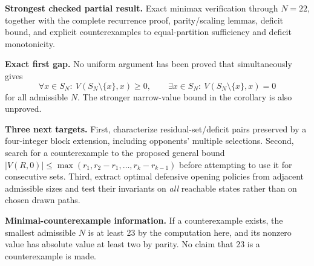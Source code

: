 \documentclass[11pt,a4paper]{article}
\theoremstyle{definition}\newtheorem{definition}[theorem]{Definition}
\theoremstyle{remark}\newtheorem{remark}[theorem]{Remark}
\newcommand{\1}{\mathbf 1}
\begin{document}
\textbf{Strongest checked partial result.} Exact minimax verification through $N=22$, together with the complete recurrence proof, parity/scaling lemmas, deficit bound, and explicit counterexamples to equal-partition sufficiency and deficit monotonicity.

\textbf{Exact first gap.} No uniform argument has been proved that simultaneously gives
\[
 \forall x\in S_N:\ V(S_N\setminus\{x\},x)\ge0,
 \qquad \exists x\in S_N:\ V(S_N\setminus\{x\},x)=0
\]
for all admissible $N$. The stronger narrow-value bound in the corollary is also unproved.

\textbf{Three next targets.} First, characterize residual-set/deficit pairs preserved by a four-integer block extension, including opponents' multiple selections. Second, search for a counterexample to the proposed general bound $|V(R,0)|\le\max(r_1,r_2-r_1,\ldots,r_k-r_{k-1})$ before attempting to use it for consecutive sets. Third, extract optimal defensive opening policies from adjacent admissible sizes and test their invariants on \emph{all} reachable states rather than on chosen drawn paths.

\textbf{Minimal-counterexample information.} If a counterexample exists, the smallest admissible $N$ is at least 23 by the computation here, and its nonzero value has absolute value at least two by parity. No claim that 23 is a counterexample is made.
\end{document}
